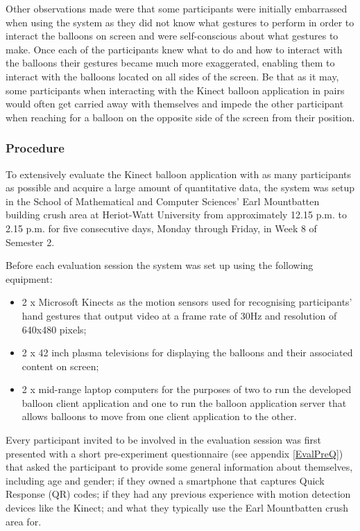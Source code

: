 Other observations made were that some participants were initially embarrassed when using the system as they did not know what gestures to perform in order to interact the balloons on screen and were self-conscious about what gestures to make. Once each of the participants knew what to do and how to interact with the balloons their gestures became much more exaggerated, enabling them to interact with the balloons located on all sides of the screen. Be that as it may, some participants when interacting with the Kinect balloon application in pairs would often get carried away with themselves and impede the other participant when reaching for a balloon on the opposite side of the screen from their position.


\subsubsection{Procedure}
To extensively evaluate the Kinect balloon application with as many participants as possible and acquire a large amount of quantitative data, the system was setup in the School of Mathematical and Computer Sciences' Earl Mountbatten building crush area at Heriot-Watt University from approximately 12.15 p.m. to 2.15 p.m. for five consecutive days, Monday through Friday, in Week 8 of Semester 2.

Before each evaluation session the system was set up using the following equipment:
\begin{itemize}
\item{2 x Microsoft Kinects as the motion sensors used for recognising participants' hand gestures that output video at a frame rate of 30Hz and resolution of 640x480 pixels;}
\item{2 x 42 inch plasma televisions for displaying the balloons and their associated content on screen;}
\item{2 x mid-range laptop computers for the purposes of two to run the developed balloon client application and one to run the balloon application server that allows balloons to move from one client application to the other.}
\end{itemize}

Every participant invited to be involved in the evaluation session was first presented with a short pre-experiment questionnaire (see appendix \vref{EvalPreQ}) that asked the participant to provide some general information about themselves, including age and gender; if they owned a smartphone that captures Quick Response (QR) codes; if they had any previous experience with motion detection devices like the Kinect; and what they typically use the Earl Mountbatten crush area for.

